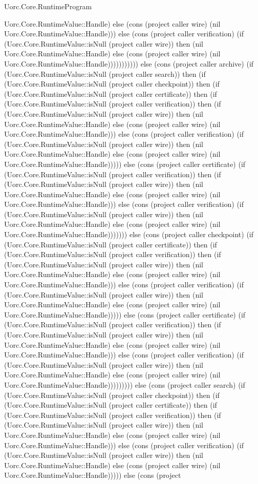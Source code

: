 \begin{lexlean}{Uorc.Core.RuntimeProgram}
\begin{semanticmodule}
{Uorc.Core.RuntimeValue::Handle) else (cons (project caller wire) (nil Uorc.Core.RuntimeValue::Handle))) else (cons (project caller verification) (if (Uorc.Core.RuntimeValue::isNull (project caller wire)) then (nil Uorc.Core.RuntimeValue::Handle) else (cons (project caller wire) (nil Uorc.Core.RuntimeValue::Handle))))))))))) else (cons (project caller archive) (if (Uorc.Core.RuntimeValue::isNull (project caller search)) then (if (Uorc.Core.RuntimeValue::isNull (project caller checkpoint)) then (if (Uorc.Core.RuntimeValue::isNull (project caller certificate)) then (if (Uorc.Core.RuntimeValue::isNull (project caller verification)) then (if (Uorc.Core.RuntimeValue::isNull (project caller wire)) then (nil Uorc.Core.RuntimeValue::Handle) else (cons (project caller wire) (nil Uorc.Core.RuntimeValue::Handle))) else (cons (project caller verification) (if (Uorc.Core.RuntimeValue::isNull (project caller wire)) then (nil Uorc.Core.RuntimeValue::Handle) else (cons (project caller wire) (nil Uorc.Core.RuntimeValue::Handle))))) else (cons (project caller certificate) (if (Uorc.Core.RuntimeValue::isNull (project caller verification)) then (if (Uorc.Core.RuntimeValue::isNull (project caller wire)) then (nil Uorc.Core.RuntimeValue::Handle) else (cons (project caller wire) (nil Uorc.Core.RuntimeValue::Handle))) else (cons (project caller verification) (if (Uorc.Core.RuntimeValue::isNull (project caller wire)) then (nil Uorc.Core.RuntimeValue::Handle) else (cons (project caller wire) (nil Uorc.Core.RuntimeValue::Handle))))))) else (cons (project caller checkpoint) (if (Uorc.Core.RuntimeValue::isNull (project caller certificate)) then (if (Uorc.Core.RuntimeValue::isNull (project caller verification)) then (if (Uorc.Core.RuntimeValue::isNull (project caller wire)) then (nil Uorc.Core.RuntimeValue::Handle) else (cons (project caller wire) (nil Uorc.Core.RuntimeValue::Handle))) else (cons (project caller verification) (if (Uorc.Core.RuntimeValue::isNull (project caller wire)) then (nil Uorc.Core.RuntimeValue::Handle) else (cons (project caller wire) (nil Uorc.Core.RuntimeValue::Handle))))) else (cons (project caller certificate) (if (Uorc.Core.RuntimeValue::isNull (project caller verification)) then (if (Uorc.Core.RuntimeValue::isNull (project caller wire)) then (nil Uorc.Core.RuntimeValue::Handle) else (cons (project caller wire) (nil Uorc.Core.RuntimeValue::Handle))) else (cons (project caller verification) (if (Uorc.Core.RuntimeValue::isNull (project caller wire)) then (nil Uorc.Core.RuntimeValue::Handle) else (cons (project caller wire) (nil Uorc.Core.RuntimeValue::Handle))))))))) else (cons (project caller search) (if (Uorc.Core.RuntimeValue::isNull (project caller checkpoint)) then (if (Uorc.Core.RuntimeValue::isNull (project caller certificate)) then (if (Uorc.Core.RuntimeValue::isNull (project caller verification)) then (if (Uorc.Core.RuntimeValue::isNull (project caller wire)) then (nil Uorc.Core.RuntimeValue::Handle) else (cons (project caller wire) (nil Uorc.Core.RuntimeValue::Handle))) else (cons (project caller verification) (if (Uorc.Core.RuntimeValue::isNull (project caller wire)) then (nil Uorc.Core.RuntimeValue::Handle) else (cons (project caller wire) (nil Uorc.Core.RuntimeValue::Handle))))) else (cons (project }
\end{semanticmodule}
\end{lexlean}
